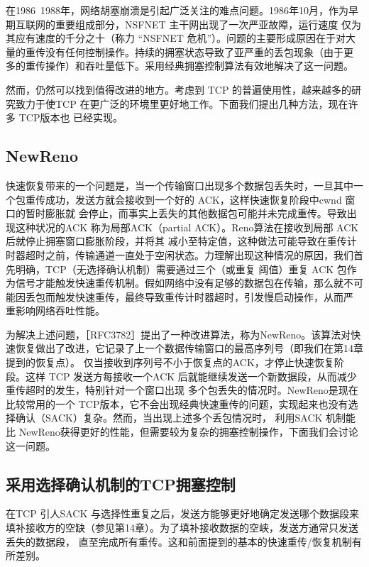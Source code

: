 \begin{tcolorbox}
    在1986~1988年，网络胡塞崩溃是引起广泛关注的难点问题。1986年10月，作为早期互联网的重要组成部分，NSFNET 主干网出现了一次严亚故障，运行速度
    仅为其应有速度的千分之十（称力 “NSFNET 危机”）。问题的主要形成原因在于对大量的重传没有任何控制操作。持续的拥塞状态导致了亚严重的丢包现象（由于更
    多的重传操作）和吞吐量低下。采用经典拥塞控制算法有效地解决了这一问题。
\end{tcolorbox}


然而，仍然可以找到值得改进的地方。考虑到 TCP 的普遍使用性，越来越多的研究致力于使TCP 在更广泛的环境里更好地工作。下面我们提出几种方法，现在许多 TCP版本也
已经实现。

\subsection{NewReno}
快速恢复带来的一个问题是，当一个传输窗口出现多个数据包丢失时，一旦其中一个包重传成功，发送方就会接收到一个好的 ACK，这样快速恢复阶段中cwnd 窗口的暂时膨胀就
会停止，而事实上丢失的其他数据包可能并未完成重传。导致出现这种状况的ACK 称为局部ACK（partial ACK）。Reno算法在接收到局部 ACK 后就停止拥塞窗口膨胀阶段，并将其
减小至特定值，这种做法可能导致在重传计时器超时之前，传输通道一直处于空闲状态。力理解出现这种情况的原因，我们首先明确，TCP（无选择确认机制）需要通过三个（或重复
阈值）重复 ACK 包作为信号才能触发快速重传机制。假如网络中没有足够的数据包在传输，那么就不可能因丢包而触发快速重传，最终导致重传计时器超时，引发慢启动操作，从而严
重影响网络吞吐性能。

为解决上述问题，［RFC3782］提出了一种改进算法，称为NewReno。该算法对快速恢复做出了改进，它记录了上一个数据传输窗口的最高序列号（即我们在第14章提到的恢复点）。
仅当接收到序列号不小于恢复点的ACK，才停止快速恢复阶段。这样 TCP 发送方每接收一个ACK 后就能继续发送一个新数据段，从而减少重传超时的发生，特别针对一个窗口出现
多个包丢失的情况时。NewReno是现在比较常用的一个 TCP版本，它不会出现经典快速重传的问题，实现起来也没有选择确认（SACK）复杂。然而，当出现上述多个丢包情况时，
利用SACK 机制能比 NewReno获得更好的性能，但需要较为复杂的拥塞控制操作，下面我们会讨论这一问题。

\subsection{采用选择确认机制的TCP拥塞控制}
在TCP 引人SACK 与选择性重复之后，发送方能够更好地确定发送哪个数据段来填补接收方的空缺（参见第14章）。为了填补接收数据的空峡，发送方通常只发送丢失的数据段，
直至完成所有重传。这和前面提到的基本的快速重传/恢复机制有所差别。

